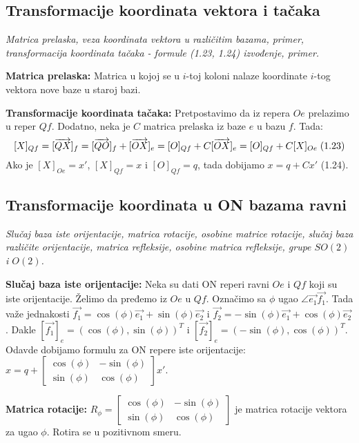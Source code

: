 \documentclass[12pt]{article}
\newcommand{\vek}[1]{\overrightarrow{#1}}
\begin{document}
\subsection{Transformacije koordinata vektora i tačaka}
\textit{Matrica prelaska, veza koordinata vektora u različitim bazama,
    primer, transformacija koordinata tačaka - formule (1.23, 1.24)
    izvođenje, primer.}
\par
\vspace*{1cm}

\textbf{Matrica prelaska:} Matrica u kojoj se u $i$-toj koloni nalaze
koordinate $i$-tog vektora nove baze u staroj bazi.
\par

\textbf{Transformacije koordinata tačaka:} Pretpostavimo da iz repera $Oe$
prelazimo u reper $Qf$. Dodatno, neka je $C$ matrica prelaska iz baze $e$ u
bazu $f$. Tada:
$$[X]_{Qf}=[\vek{QX}]_f=[\vek{QO}]_f+[\vek{OX}]_e=[O]_{Qf}+C[\vek{OX}]_e=[O]_{Qf}+C[X]_{Oe}\hspace*{0.1cm}\text{(1.23)}$$
Ako je $[X]_{Oe}=x'$, $[X]_{Qf}=x$ i $[O]_{Qf}=q$, tada dobijamo $x=q+Cx'$ (1.24).

\subsection{Transformacije koordinata u ON bazama ravni}
\label{subsec:pitanje_9}
\textit{Slučaj baza iste orijentacije, matrica rotacije, osobine matrice
    rotacije, slučaj baza različite orijentacije, matrica refleksije,
    osobine matrica refleksije, grupe $SO(2)$ i $O(2)$.}
\par
\vspace*{1cm}

\textbf{Slučaj baza iste orijentacije:} Neka su dati ON reperi ravni $Oe$ i $Qf$
koji su iste orijentacije. Želimo da pređemo iz $Oe$ u $Qf$. Označimo sa $\phi$
ugao $\angle{\vek{e_1}\vek{f_1}}$. Tada važe jednakosti
$\vek{f_1}=\cos(\phi)\vek{e_1}+\sin(\phi)\vek{e_2}$ i
$\vek{f_2}=-\sin(\phi)\vek{e_1}+\cos(\phi)\vek{e_2}$. Dakle
$[\vek{f_1}]_e=(\cos(\phi),\sin(\phi))^T$ i $[\vek{f_2}]_e=(-\sin(\phi),\cos(\phi))^T$.
Odavde dobijamo formulu za ON repere iste orijentacije: $x=q+\begin{bmatrix}
        \cos(\phi) & -\sin(\phi) \\
        \sin(\phi) & \cos(\phi)
    \end{bmatrix} x'$.
\par

\textbf{Matrica rotacije:} $R_\phi=\begin{bmatrix}
        \cos(\phi) & -\sin(\phi) \\
        \sin(\phi) & \cos(\phi)
    \end{bmatrix}$ je matrica rotacije vektora za ugao $\phi$. Rotira se u
pozitivnom smeru.
\par
\end{document}
